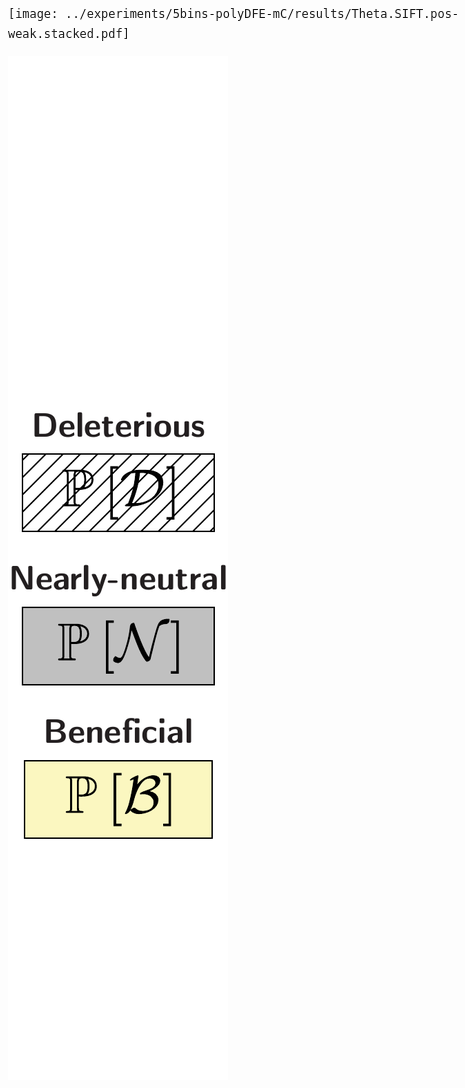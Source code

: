 \documentclass{article}
\begin{document}
\begin{center}
\begin{minipage}{0.09\linewidth}
        \end{minipage}
        \begin{minipage}{0.9\linewidth}
            \texttt{[image: ../experiments/5bins-polyDFE-mC/results/Theta.SIFT.pos-weak.stacked.pdf]} \\
        \end{minipage}
        \begin{minipage}{0.09\linewidth}
            \includegraphics[width=\linewidth, page=1]{artworks/legend.polycat}

\end{minipage}
\end{center}
\end{document}
